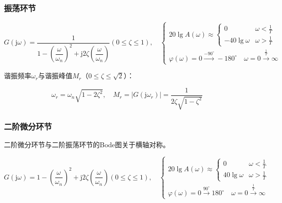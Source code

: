 \documentclass[cn, blue, normal, 12pt]{elegantnote}
\begin{document}
\subsubsection{振荡环节}

\begin{equation}
    G(\mathrm{j}\omega)=\frac{1}{1-\left(\dfrac{\omega}{\omega_n}\right)^2+\mathrm{j}2\zeta\left(\dfrac{\omega}{\omega_n}\right)} (0\leq \zeta\leq 1), \quad 
    \left\{
        \begin{array}{l}
            20\lg{A(\omega)}\approx\left\{
                \begin{array}{ll}
                    0 & \omega<\frac{1}{T} \\
                    -40\lg{\omega} & \omega>\frac{1}{T}
                \end{array}
            \right. \\
            \varphi(\omega)=0 \stackrel{-90^{\circ}}{\rightarrow} -180^{\circ} \quad \omega=0  \stackrel{\frac{1}{T}}{\rightarrow} \infty
        \end{array}
    \right.
\end{equation}

谐振频率$\omega_r$与谐振峰值$M_r$（$0\leq\zeta\leq\sqrt{2}$）：

\begin{equation}
    \omega_r=\omega_n\sqrt{1-2\zeta^2}, \quad M_r=|G(\mathrm{j}\omega_r)|=\frac{1}{2\zeta\sqrt{1-\zeta^2}}
\end{equation}

\subsubsection{二阶微分环节}

二阶微分环节与二阶振荡环节的Bode图关于横轴对称。

\begin{equation}
    G(\mathrm{j}\omega)=1-\left(\dfrac{\omega}{\omega_n}\right)^2+\mathrm{j}2\zeta\left(\dfrac{\omega}{\omega_n}\right) (0\leq \zeta\leq 1), \quad 
    \left\{
        \begin{array}{l}
            20\lg{A(\omega)}\approx\left\{
                \begin{array}{ll}
                    0 & \omega<\frac{1}{T} \\
                    40\lg{\omega} & \omega>\frac{1}{T}
                \end{array}
            \right. \\
            \varphi(\omega)=0 \stackrel{90^{\circ}}{\rightarrow} 180^{\circ} \quad \omega=0  \stackrel{\frac{1}{T}}{\rightarrow} \infty
        \end{array}
    \right.
\end{equation}
\end{document}
